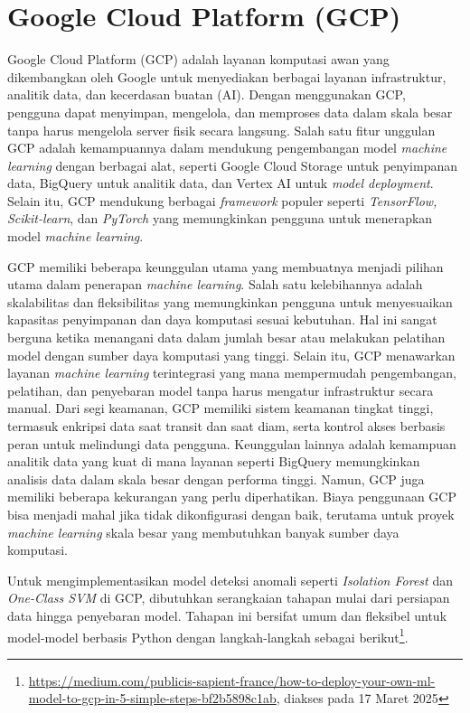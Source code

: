 \section{Google Cloud Platform (GCP)}\label{sec:gcp}

Google Cloud Platform (GCP) adalah layanan komputasi awan yang dikembangkan oleh Google untuk menyediakan berbagai layanan infrastruktur, analitik data, dan kecerdasan buatan (AI). Dengan menggunakan GCP, pengguna dapat menyimpan, mengelola, dan memproses data dalam skala besar tanpa harus mengelola server fisik secara langsung. Salah satu fitur unggulan GCP adalah kemampuannya dalam mendukung pengembangan model {\it machine learning} dengan berbagai alat, seperti Google Cloud Storage untuk penyimpanan data, BigQuery untuk analitik data, dan Vertex AI untuk {\it model deployment}. Selain itu, GCP mendukung berbagai {\it framework} populer seperti {\it TensorFlow, Scikit-learn}, dan {\it PyTorch} yang memungkinkan pengguna untuk menerapkan model {\it machine learning}.

GCP memiliki beberapa keunggulan utama yang membuatnya menjadi pilihan utama dalam penerapan {\it machine learning}. Salah satu kelebihannya adalah skalabilitas dan fleksibilitas yang memungkinkan pengguna untuk menyesuaikan kapasitas penyimpanan dan daya komputasi sesuai kebutuhan. Hal ini sangat berguna ketika menangani data dalam jumlah besar atau melakukan pelatihan model dengan sumber daya komputasi yang tinggi. Selain itu, GCP menawarkan layanan {\it machine learning} terintegrasi yang mana mempermudah pengembangan, pelatihan, dan penyebaran model tanpa harus mengatur infrastruktur secara manual. Dari segi keamanan, GCP memiliki sistem keamanan tingkat tinggi, termasuk enkripsi data saat transit dan saat diam, serta kontrol akses berbasis peran untuk melindungi data pengguna. Keunggulan lainnya adalah kemampuan analitik data yang kuat di mana layanan seperti BigQuery memungkinkan analisis data dalam skala besar dengan performa tinggi. Namun, GCP juga memiliki beberapa kekurangan yang perlu diperhatikan. Biaya penggunaan GCP bisa menjadi mahal jika tidak dikonfigurasi dengan baik, terutama untuk proyek {\it machine learning} skala besar yang membutuhkan banyak sumber daya komputasi. 

Untuk mengimplementasikan model deteksi anomali seperti {\it Isolation Forest} dan {\it One-Class SVM} di GCP, dibutuhkan serangkaian tahapan mulai dari persiapan data hingga penyebaran model. Tahapan ini bersifat umum dan fleksibel untuk model-model berbasis Python dengan langkah-langkah sebagai berikut\footnote{\url{https://medium.com/publicis-sapient-france/how-to-deploy-your-own-ml-model-to-gcp-in-5-simple-steps-bf2b5898c1ab}, diakses pada 17 Maret 2025}.
    
